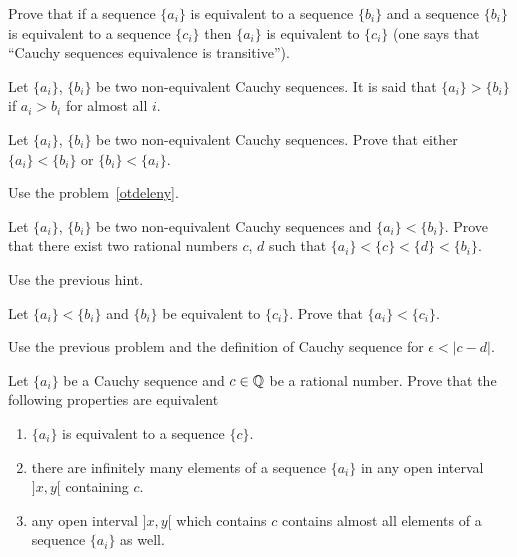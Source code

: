 \documentclass[12pt]{article}
\begin{document}
\begin{zadacha} [!] Prove that if a sequence $\{a_i\}$
is equivalent to a sequence $\{b_i\}$ and a sequence $\{b_i\}$ is
equivalent to a sequence $\{c_i\}$ then $\{a_i\}$ is equivalent to
$\{c_i\}$ (one says that ``Cauchy sequences equivalence is
transitive'').
\end{zadacha}

\begin{opredelenie}
Let $\{a_i\}$, $\{b_i\}$ be two non-equivalent Cauchy sequences. It is
said that $\{a_i\} > \{b_i\}$ if $a_i > b_i$ for almost all $i$.
\end{opredelenie}

\begin{zadacha}\label{order}
Let $\{a_i\}$, $\{b_i\}$ be two non-equivalent Cauchy sequences. Prove
that either $\{a_i\} < \{b_i\}$ or $\{b_i\} < \{a_i\}$.
\end{zadacha}

\begin{ukazanie}
Use the problem~\ref{otdeleny}.
\end{ukazanie}

\begin{zadacha}\label{inte}
Let $\{a_i\}$, $\{b_i\}$ be two non-equivalent Cauchy sequences and
$\{a_i\} < \{b_i\}$. Prove that there exist two rational numbers $c$,
$d$ such that $\{a_i\} < \{c\} < \{d\} < \{b_i\}$.
\end{zadacha}

\begin{ukazanie}
Use the previous hint.
\end{ukazanie}

\begin{zadacha}
Let $\{a_i\} < \{b_i\}$ and $\{b_i\}$ be equivalent to
$\{c_i\}$. Prove that $\{a_i\} < \{c_i\}$.
\end{zadacha}

\begin{ukazanie}
Use the previous problem and the definition of Cauchy sequence for
$\epsilon < |c-d|$.
\end{ukazanie}

\begin{zadacha} Let $\{ a_i\}$ be a Cauchy sequence and $c\in {\mathbb Q}$ be a
  rational number.  Prove that the following properties are equivalent
\begin{enumerate}
\item $\{ a_i\}$ is equivalent to a sequence $\{c\}$.

\item there are infinitely many elements of a sequence $\{ a_i\}$ in
any open interval $]x, y[$ containing $c$.

\item any open interval $]x, y[$ which contains $c$ contains almost
    all elements of a sequence $\{ a_i\}$ as well.
\end{enumerate}
\end{zadacha}
\end{document}
